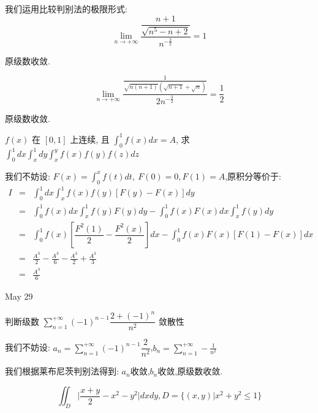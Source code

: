 \begin{solution}
	
	我们运用比较判别法的极限形式: 
	$$\lim\limits_{n\to +\infty}\dfrac{\dfrac{n+1}{\sqrt{n^5-n+2}}}{n^{-\frac{3}{2}}}=1$$
	
	原级数收敛.
	
	$$\lim\limits_{n\to +\infty}\dfrac{\frac{1}{\sqrt{n(n+1)}(\sqrt{n+1}+\sqrt{n})}}{2n^{-\frac{3}{2}}}=\frac{1}{2}$$
	
	原级数收敛.
\end{solution}

\begin{example}[][Exam: 31.4.14]
	$f(x)$ 在 $[0,1]$ 上连续, 且 $\int_{0}^{1}f(x)dx=A$, 求 $\int_{0}^{1}dx\int_{x}^{1}dy\int_{x}^{y}f(x)f(y)f(z)dz$
\end{example}

\begin{solution}
	
	我们不妨设: $F(x)=\int_{0}^{x}f(t)dt,\ F(0)=0,F(1)=A$,原积分等价于: 
	\begin{eqnarray*}
		I&=&\int_{0}^{1}dx\int_{x}^{1}f(x)f(y)[F(y)-F(x)]dy\\
		&=&\int_{0}^{1}f(x)dx\int_{x}^{1}f(y)F(y)dy-\int_{0}^{1}f(x)F(x)dx\int_{x}^{1}f(y)dy\\
		&=&\int_{0}^{1}f(x)[\dfrac{F^2(1)}{2}-\dfrac{F^2(x)}{2}]dx-\int_{0}^{1}f(x)F(x)[F(1)-F(x)]dx\\
		&=&\frac{A^3}{2}-\frac{A^3}{6}-\frac{A^3}{2}+\frac{A^3}{3}\\
		&=&\frac{A^3}{6}
	\end{eqnarray*}
\end{solution}


\textcolor{purplea}{May 29}

\begin{example}[][Exam: 31.4.15]
	判断级数 $\sum\limits_{n=1}^{+\infty}(-1)^{n-1}\dfrac{2+(-1)^n}{n^2}$ 敛散性
\end{example}

\begin{solution}
	
	我们不妨设: $a_{n}=\sum\limits_{n=1}^{+\infty}(-1)^{n-1}\dfrac{2}{n^2}$,$b_{n}=\sum\limits_{n=1}^{+\infty}-\frac{1}{n^2}$
	
	我们根据莱布尼茨判别法得到: 
	$a_{n}$收敛,$b_{n}$收敛,原级数收敛.
\end{solution}

\begin{example}[][Exam: 31.4.16]
	$$\iint_{D}\big|\dfrac{x+y}{2}-x^2-y^2\big|dxdy, D=\{(x,y)|x^2+y^2\leq 1\}$$
\end{example}

